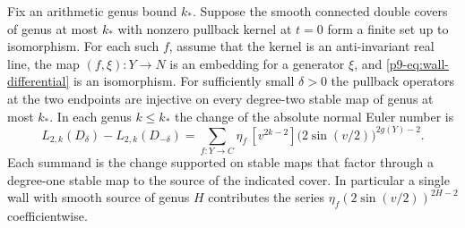 \begin{theorem}\label{p9-thm:wall}
Fix an arithmetic genus bound $k_*$. Suppose the smooth connected
double covers of genus at most $k_*$ with nonzero pullback kernel at
$t=0$ form a finite set up to isomorphism. For each such $f$, assume
that the kernel is an anti-invariant real line, the map
$(f,\xi):Y\to N$ is an embedding for a generator $\xi$, and
\eqref{p9-eq:wall-differential} is an isomorphism. For sufficiently small
$\delta>0$ the pullback operators at the two endpoints are injective on every
degree-two stable map of genus at most $k_*$. In each
genus $k\le k_*$ the change of the absolute normal Euler number is
\begin{equation}\label{p9-eq:wall-jump}
 L_{2,k}(D_{\delta})-L_{2,k}(D_{-\delta})
 =\sum_{f:Y\to C}\eta_f\,[v^{2k-2}]
                \bigl(2\sin(v/2)\bigr)^{2g(Y)-2}.
\end{equation}
Each summand is the change supported on stable maps that factor through a degree-one
stable map to the source of the indicated cover. In particular a single wall with smooth
source of genus $H$ contributes the series
$\eta_f(2\sin(v/2))^{2H-2}$ coefficientwise.
\end{theorem}


